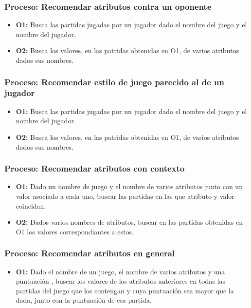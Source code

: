 \subsubsection{Proceso: Recomendar atributos contra un oponente}

\begin{itemize}
	\item \textbf{O1:} Busca las partidas jugadas por un jugador dado el nombre del juego y
		el nombre del jugador.\\
	\item \textbf{O2:} Busca los valores, en las patridas obtenidas
		en O1, de varios atributos dados sus nombres.\\
\end{itemize}


\subsubsection{Proceso: Recomendar estilo de juego parecido al de un jugador}

\begin{itemize}
	\item \textbf{O1:} Busca las partidas jugadas por un jugador dado el nombre del juego y
		el nombre del jugador.\\
	\item \textbf{O2:} Busca los valores, en las patridas obtenidas
		en O1, de varios atributos dados sus nombres.\\
\end{itemize}


\subsubsection{Proceso: Recomendar atributos con contexto}

\begin{itemize}
	\item \textbf{O1:} Dado un nombre de juego y el nombre de varios
		atributos junto con un valor asociado a cada uno, 
		buscar las partidas en las que atributo y valor coincidan.\\
	\item \textbf{O2:} Dados varios nombres de atributos, buscar en las
		partidas obtenidas en O1 los valores correspondiantes a
		estos.\\
\end{itemize}


\subsubsection{Proceso: Recomendar atributos en general}

\begin{itemize}
	\item \textbf{O1:} Dado el nombre de un juego, el nombre de varios atributos y una puntuación
		, buscar los valores de los atributos anteriores en todas las partidas del juego
		que los contengan y cuya puntuación sea mayor que la dada, junto con la puntuación
		de esa partida.\\
\end{itemize}
